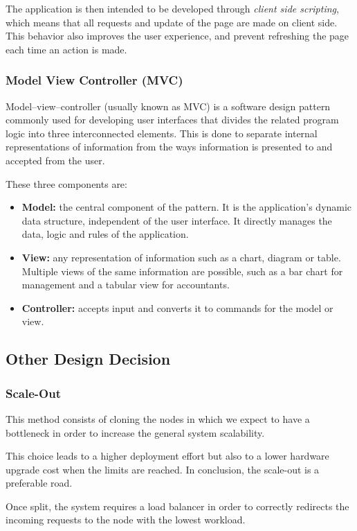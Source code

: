 \documentclass[table, 12pt]{article}
\begin{document}
The application is then intended to be developed through \textit{client side scripting}, which means that all requests and update of the page are made on client side. This behavior also improves the user experience, and prevent refreshing the page each time an action is made.

\subsubsection{Model View Controller (MVC)}
Model–view–controller (usually known as MVC) is a software design pattern commonly used for developing user interfaces that divides the related program logic into three interconnected elements. This is done to separate internal representations of information from the ways information is presented to and accepted from the user.

These three components are:
\begin{itemize}
    \item \textbf{Model:} the central component of the pattern. It is the application's dynamic data structure, independent of the user interface. It directly manages the data, logic and rules of the application.
    \item \textbf{View:} any representation of information such as a chart, diagram or table. Multiple views of the same information are possible, such as a bar chart for management and a tabular view for accountants.
    \item \textbf{Controller:} accepts input and converts it to commands for the model or view.
\end{itemize}

\subsection{Other Design Decision}
\subsubsection{Scale-Out}
This method consists of cloning the nodes in which we expect to have a bottleneck in order to increase the general system scalability.

This choice leads to a higher deployment effort but also to a lower hardware upgrade cost when the limits are reached. In conclusion, the scale-out is a preferable road.

Once split, the system requires a load balancer in order to correctly redirects the incoming requests to the node with the lowest workload.
\end{document}
